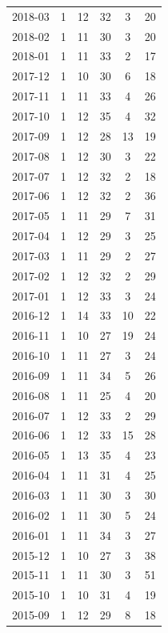 \documentclass[12pt]{report}
\begin{document}
\begin{longtable}{|c|c|c|c|c|c|}
            2018-03 & 1 & 12 & 32 & 3 & 20 \\
            2018-02 & 1 & 11 & 30 & 3 & 20 \\
            2018-01 & 1 & 11 & 33 & 2 & 17 \\
            2017-12 & 1 & 10 & 30 & 6 & 18 \\
            2017-11 & 1 & 11 & 33 & 4 & 26 \\
            2017-10 & 1 & 12 & 35 & 4 & 32 \\
            2017-09 & 1 & 12 & 28 & 13 & 19 \\
            2017-08 & 1 & 12 & 30 & 3 & 22 \\
            2017-07 & 1 & 12 & 32 & 2 & 18 \\
            2017-06 & 1 & 12 & 32 & 2 & 36 \\
            2017-05 & 1 & 11 & 29 & 7 & 31 \\
            2017-04 & 1 & 12 & 29 & 3 & 25 \\
            2017-03 & 1 & 11 & 29 & 2 & 27 \\
            2017-02 & 1 & 12 & 32 & 2 & 29 \\
            2017-01 & 1 & 12 & 33 & 3 & 24 \\
            2016-12 & 1 & 14 & 33 & 10 & 22 \\
            2016-11 & 1 & 10 & 27 & 19 & 24 \\
            2016-10 & 1 & 11 & 27 & 3 & 24 \\
            2016-09 & 1 & 11 & 34 & 5 & 26 \\
            2016-08 & 1 & 11 & 25 & 4 & 20 \\
            2016-07 & 1 & 12 & 33 & 2 & 29 \\
            2016-06 & 1 & 12 & 33 & 15 & 28 \\
            2016-05 & 1 & 13 & 35 & 4 & 23 \\
            2016-04 & 1 & 11 & 31 & 4 & 25 \\
            2016-03 & 1 & 11 & 30 & 3 & 30 \\
            2016-02 & 1 & 11 & 30 & 5 & 24 \\
            2016-01 & 1 & 11 & 34 & 3 & 27 \\
            2015-12 & 1 & 10 & 27 & 3 & 38 \\
            2015-11 & 1 & 11 & 30 & 3 & 51 \\
            2015-10 & 1 & 10 & 31 & 4 & 19 \\
            2015-09 & 1 & 12 & 29 & 8 & 18 \\

\end{longtable}
\end{document}
